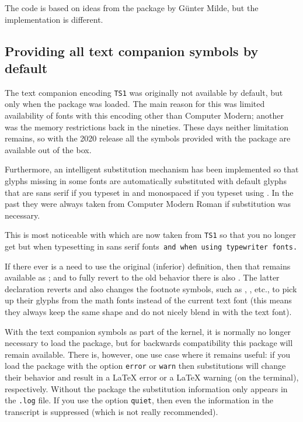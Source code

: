 \documentclass{ltnews}
\begin{document}
The code is based on ideas from the 
package by Günter Milde, but the implementation is different.


\subsection{Providing all text companion symbols by default}

The text companion encoding \texttt{TS1} was originally not available
by default, but only when the  package was loaded. The
main reason for this was limited availability of fonts with this encoding other than
Computer Modern; another was the memory restrictions back in the nineties. 
These days neither limitation remains, so with the 2020 release all
the symbols provided with the  package are available out
of the box.

Furthermore, an intelligent substitution mechanism has been
implemented so that glyphs missing in some fonts are automatically
substituted with default glyphs that are sans serif if you typeset in
 and monospaced if you typeset using . In the
past they were always taken from Computer Modern Roman if substitution
was necessary.


\textsf{This is most noticeable with  which are now
  taken from \texttt{TS1} so that you no longer get
  \textrm{} but  when typesetting
  in sans serif fonts}\texttt{ and  when using
  typewriter fonts.}

If there ever is a need to use the original (inferior) definition,
then that remains available as ; and to fully
revert to the old behavior there is also
. The latter declaration reverts 
and also changes the footnote symbols, such as ,
, etc., to pick up their glyphs from the math
fonts instead of the current text font (this means they always keep
the same shape and do not nicely blend in with the text font).

With the text companion symbols as part of the kernel, it is normally
no longer necessary to load the  package, but for
backwards compatibility this package will remain available.  There is,
however, one use case where it remains useful: if you load the package
with the option \texttt{error} or \texttt{warn} then substitutions
will change their behavior and result in a \LaTeX{} error or a
\LaTeX{} warning (on the terminal), respectively. Without the package
the substitution information only appears in the \texttt{.log}
file. If you use the option \texttt{quiet}, then even the information in
the transcript is suppressed (which is not really recommended).
\end{document}

